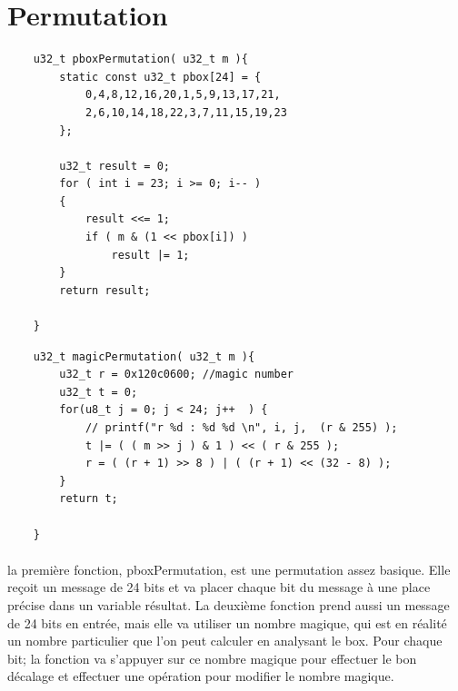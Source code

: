 \documentclass{report}
\begin{document}
\section{ Permutation } 

\begin{lstlisting}
    u32_t pboxPermutation( u32_t m ){
        static const u32_t pbox[24] = {
            0,4,8,12,16,20,1,5,9,13,17,21,
            2,6,10,14,18,22,3,7,11,15,19,23
        };

        u32_t result = 0;
        for ( int i = 23; i >= 0; i-- )
        { 
            result <<= 1;
            if ( m & (1 << pbox[i]) )
                result |= 1;        
        }
        return result;

    }
\end{lstlisting}

\begin{lstlisting}
    u32_t magicPermutation( u32_t m ){
        u32_t r = 0x120c0600; //magic number 
        u32_t t = 0;
        for(u8_t j = 0; j < 24; j++  ) {
            // printf("r %d : %d %d \n", i, j,  (r & 255) );
            t |= ( ( m >> j ) & 1 ) << ( r & 255 );
            r = ( (r + 1) >> 8 ) | ( (r + 1) << (32 - 8) );   
        }
        return t;

    }
\end{lstlisting}

\paragraph{} la première fonction, pboxPermutation, est une permutation assez basique. 
Elle reçoit un message de 24 bits et va placer chaque bit du message à une place précise dans un variable résultat.
La deuxième fonction prend aussi un message de 24 bits en entrée, mais elle va utiliser un nombre magique, 
qui est en réalité un nombre particulier que l'on peut calculer en analysant le box. Pour chaque bit; 
la fonction va s'appuyer sur ce nombre magique pour effectuer le bon décalage et effectuer une opération pour modifier le nombre magique.
\end{document}
